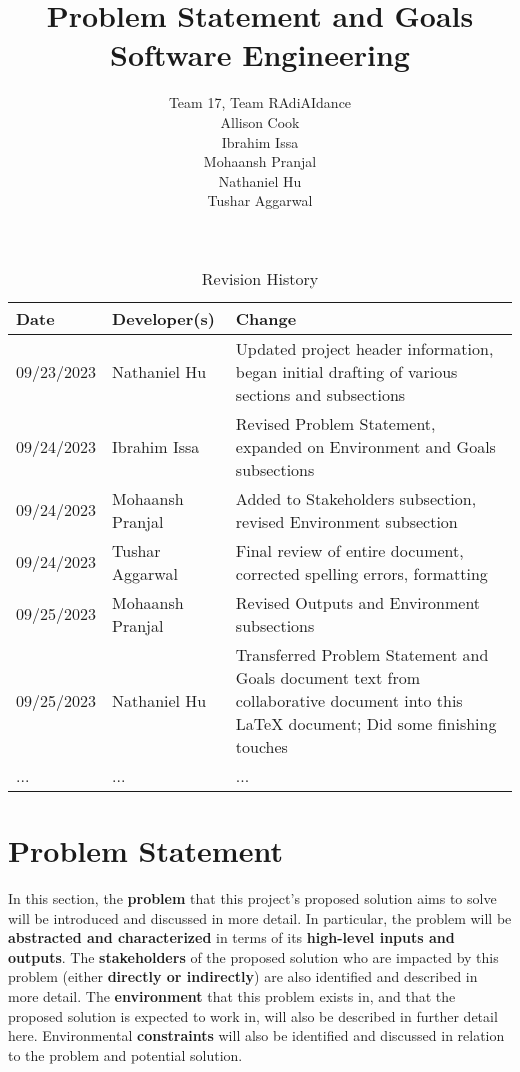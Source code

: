\documentclass{article}
\title{Problem Statement and Goals\\Software Engineering}
\author{Team 17, Team RAdiAIdance\\Allison Cook\\Ibrahim Issa\\Mohaansh Pranjal\\Nathaniel Hu\\Tushar Aggarwal}
\date{}
\begin{document}
\maketitle

\begin{table}[hp]
\caption{Revision History} \label{TblRevisionHistory}
\begin{tabularx}{\textwidth}{llX}
\toprule
\textbf{Date} & \textbf{Developer(s)} & \textbf{Change}\\
\midrule
09/23/2023 & Nathaniel Hu & Updated project header information, began initial drafting of various sections and subsections \\
09/24/2023 & Ibrahim Issa & Revised Problem Statement, expanded on Environment and Goals subsections \\
09/24/2023 & Mohaansh Pranjal & Added to Stakeholders subsection, revised Environment subsection \\
09/24/2023 & Tushar Aggarwal & Final review of entire document, corrected spelling errors, formatting \\
09/25/2023 & Mohaansh Pranjal & Revised Outputs and Environment subsections \\
09/25/2023 & Nathaniel Hu & Transferred Problem Statement and Goals document text from collaborative document into this LaTeX document; Did some finishing touches \\
... & ... & ...\\
\bottomrule
\end{tabularx}
\end{table}

\section{Problem Statement}

In this section, the \textbf{problem} that this project's proposed solution aims to solve will be introduced and discussed in more detail.
In particular, the problem will be \textbf{abstracted and characterized} in terms of its \textbf{high-level inputs and outputs}.
The \textbf{stakeholders} of the proposed solution who are impacted by this problem (either \textbf{directly or indirectly}) are also identified and described in more detail.
The \textbf{environment} that this problem exists in, and that the proposed solution is expected to work in, will also be described in further detail here.
Environmental \textbf{constraints} will also be identified and discussed in relation to the problem and potential solution.
\end{document}
